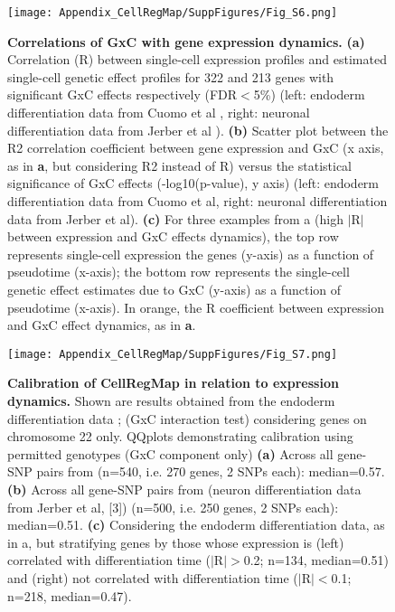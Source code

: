 \begin{figure}[h]
    \centering
    \texttt{[image: Appendix\_CellRegMap/SuppFigures/Fig\_S6.png]}
    \caption{\textbf{Correlations of GxC with gene expression dynamics.}
    \textbf{(a)} Correlation (R) between single-cell expression profiles and estimated single-cell genetic effect profiles for 322 and 213 genes with significant GxC effects respectively (FDR$<$5\%) (left: endoderm differentiation data from Cuomo et al \cite{cuomo2020single}, right: neuronal differentiation data from Jerber et al \cite{jerber2021population}). 
    \textbf{(b)} Scatter plot between the R2 correlation coefficient between gene expression and GxC (x axis, as in \textbf{a}, but considering R2 instead of R) versus the statistical significance of GxC effects (-log10(p-value), y axis)  (left: endoderm differentiation data from Cuomo et al, right: neuronal differentiation data from Jerber et al). 
    \textbf{(c)} For three examples from a (high $|$R$|$ between expression and GxC effects dynamics), the top row represents single-cell expression the genes (y-axis) as a function of pseudotime (x-axis); the bottom row represents the single-cell genetic effect estimates due to GxC (y-axis) as a function of pseudotime (x-axis). 
    In orange, the R coefficient between expression and GxC effect dynamics, as in \textbf{a}.
}
\end{figure}

\begin{figure}[h]
    \centering
    \texttt{[image: Appendix\_CellRegMap/SuppFigures/Fig\_S7.png]}
    \caption{\textbf{Calibration of CellRegMap in relation to expression dynamics.}
    Shown are results obtained from the endoderm differentiation data \cite{cuomo2020single}; (GxC interaction test) considering genes on chromosome 22 only. 
    QQplots demonstrating calibration using permitted genotypes (GxC component only) \textbf{(a)} Across all gene-SNP pairs from (n=540, i.e. 270 genes, 2 SNPs each): median=0.57. 
    \textbf{(b)} Across all gene-SNP pairs from (neuron differentiation data from Jerber et al, [3]) (n=500, i.e. 250 genes, 2 SNPs each): median=0.51. 
    \textbf{(c)} Considering the endoderm differentiation data, as in a, but stratifying genes by those whose expression is (left) correlated with differentiation time ($|$R$|>$0.2; n=134, median=0.51) and (right) not correlated with differentiation time ($|$R$|<$0.1; n=218, median=0.47).
}
\end{figure}

